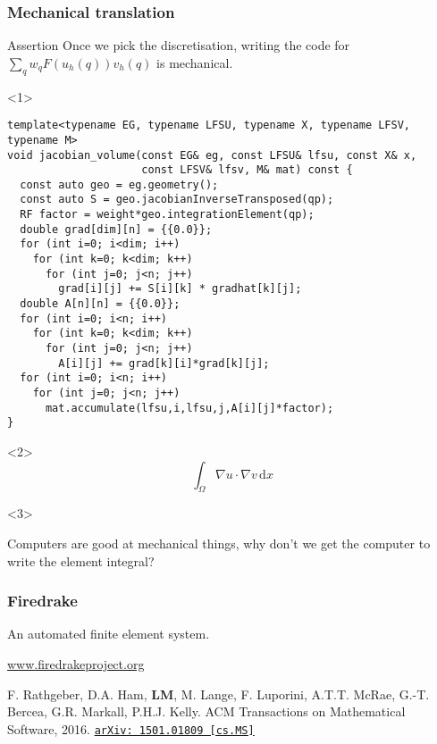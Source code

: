 \documentclass[presentation]{beamer}
\newcommand{\arxivlink}[2]{%
  \href{http://www.arxiv.org/abs/#1}%
  {{\small\texttt{arXiv:\,#1\,[#2]}}}%
}
\begin{document}
\begin{frame}[fragile]
  \frametitle{Mechanical translation}
  \begin{block}{Assertion}
    Once we pick the discretisation, writing the code for $\sum_q w_q
    F(u_h(q)) v_h(q)$ is mechanical.
  \end{block}
  \begin{center}
    \begin{overlayarea}{\textwidth}{0.8\textheight}
      \begin{onlyenv}<1>
\begin{verbatim}
template<typename EG, typename LFSU, typename X, typename LFSV, typename M>
void jacobian_volume(const EG& eg, const LFSU& lfsu, const X& x,
                     const LFSV& lfsv, M& mat) const {
  const auto geo = eg.geometry();
  const auto S = geo.jacobianInverseTransposed(qp);
  RF factor = weight*geo.integrationElement(qp);
  double grad[dim][n] = {{0.0}};
  for (int i=0; i<dim; i++)
    for (int k=0; k<dim; k++)
      for (int j=0; j<n; j++)
        grad[i][j] += S[i][k] * gradhat[k][j];
  double A[n][n] = {{0.0}};
  for (int i=0; i<n; i++)
    for (int k=0; k<dim; k++)
      for (int j=0; j<n; j++)
        A[i][j] += grad[k][i]*grad[k][j];
  for (int i=0; i<n; i++)
    for (int j=0; j<n; j++)
      mat.accumulate(lfsu,i,lfsu,j,A[i][j]*factor);
}
\end{verbatim}
      \end{onlyenv}
      \begin{onlyenv}<2>
        \begin{equation*}
          \int_\Omega \nabla u \cdot \nabla v\,\text{d}x
        \end{equation*}
      \end{onlyenv}
      \begin{onlyenv}<3>
        \begin{corollary}
          Computers are good at mechanical things, why don't we get the
          computer to write the element integral?
        \end{corollary}
      \end{onlyenv}
    \end{overlayarea}
\end{center}
\end{frame}
\begin{frame}
  \frametitle{Firedrake}

  An automated finite element system.

  \begin{center}
    \url{www.firedrakeproject.org}\\
  \end{center}

  \begin{flushright}
    {\footnotesize F. Rathgeber, D.A. Ham, \textbf{LM}, M. Lange,
      F. Luporini, A.T.T. McRae, G.-T. Bercea, G.R. Markall,
      P.H.J. Kelly. ACM Transactions on Mathematical Software,
      2016. \arxivlink{1501.01809}{cs.MS}}
  \end{flushright}
\end{frame}
\end{document}
